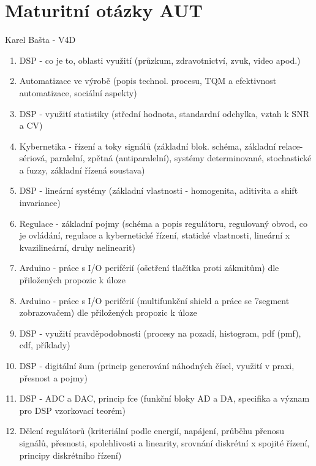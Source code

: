 \documentclass[a4paper,11pt]{article}
\begin{document}

    \section*{Maturitní otázky AUT}
        \begin{center}
            \Large Karel Bašta - V4D
        \end{center}
        
        \begin{enumerate}
            \item DSP - co je to, oblasti využití (průzkum, zdravotnictví, zvuk, video apod.)
            \item Automatizace ve výrobě (popis technol. procesu, TQM a efektivnost automatizace, sociální aspekty)
            \item DSP - využití statistiky (střední hodnota, standardní odchylka, vztah k SNR a CV)
            \item Kybernetika - řízení a toky signálů (základní blok. schéma, základní relace- sériová, paralelní, zpětná (antiparalelní), systémy determinované, stochastické a fuzzy, základní řízená soustava)
            \item DSP - lineární systémy (základní vlastnosti - homogenita, aditivita a shift invariance)
            \item Regulace - základní pojmy (schéma a popis regulátoru, regulovaný obvod, co je ovládání, regulace a kybernetické řízení, statické vlastnosti, lineární x kvazilineární, druhy nelinearit)
            \item Arduino - práce s I/O periférií (ošetření tlačítka proti zákmitům) dle přiložených propozic k úloze
            \item Arduino - práce s I/O periférií (multifunkční shield a práce se 7segment zobrazovačem) dle přiložených propozic k úloze
            \item DSP - využití pravděpodobnosti (procesy na pozadí, histogram, pdf (pmf), cdf, příklady)
            \item DSP - digitální šum (princip generování náhodných čísel, využití v praxi, přesnost a pojmy)
            \item DSP - ADC a DAC, princip fce (funkční bloky AD a DA, specifika a význam pro DSP vzorkovací teorém)
            \item Dělení regulátorů (kriteriální podle energií, napájení, průběhu přenosu signálů, přesnosti, spolehlivosti a linearity, srovnání diskrétní x spojité řízení, principy diskrétního řízení)

\end{enumerate}
\end{document}
